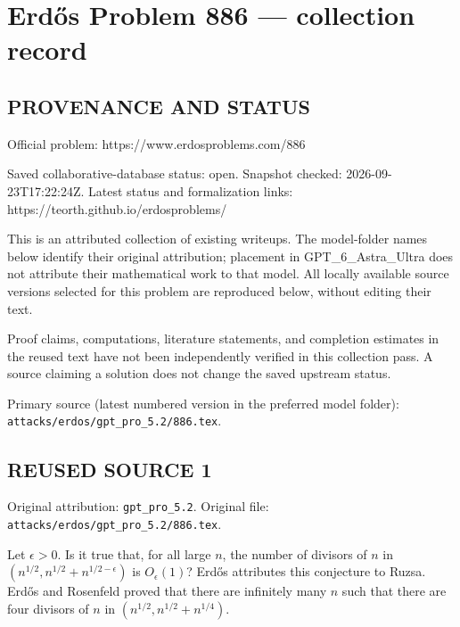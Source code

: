 \section*{Erd\H{o}s Problem 886 --- collection record}

\subsection*{PROVENANCE AND STATUS}
Official problem: https://www.erdosproblems.com/886

Saved collaborative-database status: open.
Snapshot checked: 2026-09-23T17:22:24Z.
Latest status and formalization links: https://teorth.github.io/erdosproblems/

This is an attributed collection of existing writeups. The model-folder names below identify their original attribution; placement in GPT\_6\_Astra\_Ultra does not attribute their mathematical work to that model. All locally available source versions selected for this problem are reproduced below, without editing their text.

Proof claims, computations, literature statements, and completion estimates in the reused text have not been independently verified in this collection pass. A source claiming a solution does not change the saved upstream status.

Primary source (latest numbered version in the preferred model folder): \texttt{attacks/erdos/gpt\_pro\_5.2/886.tex}.

\subsection*{REUSED SOURCE 1}
Original attribution: \texttt{gpt\_pro\_5.2}.
Original file: \texttt{attacks/erdos/gpt\_pro\_5.2/886.tex}.


Let $\epsilon>0$. Is it true that, for all large $n$, the number of divisors of $n$ in $(n^{1/2},n^{1/2}+n^{1/2-\epsilon})$ is $O_\epsilon(1)$? Erd\H{o}s attributes this conjecture to Ruzsa. Erd\H{o}s and Rosenfeld \cite{ErRo97} proved that there are infinitely many $n$ such that there are four divisors of $n$ in $(n^{1/2},n^{1/2}+n^{1/4})$.

